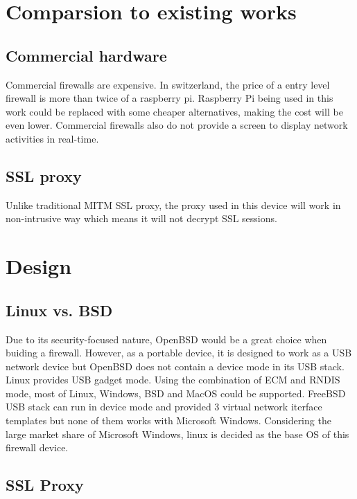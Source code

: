 \documentclass[mscthesis]{usiinfthesis}
\begin{document}
\chapter{Comparsion to existing works}
\section{Commercial hardware}
Commercial firewalls are expensive. In switzerland, the price of a entry 
level firewall is more than twice of a raspberry pi. Raspberry Pi being
used in this work could be replaced with some cheaper alternatives, making 
the cost will be even lower. Commercial firewalls also do not provide a 
screen to display network activities in real-time.

\section{SSL proxy}
Unlike traditional MITM SSL proxy, the proxy used in this device will work 
in non-intrusive way which means it will not decrypt SSL sessions.

\chapter[Design]{Design}

\section{Linux vs. BSD}

Due to its security-focused nature, OpenBSD would be a great choice when buiding a firewall. However, as a portable device, it is designed to work as a USB network device but OpenBSD does not contain a device mode in its USB stack. Linux provides USB gadget mode. Using the combination of ECM and RNDIS mode, most of Linux, Windows, BSD and MacOS could be supported. FreeBSD USB stack can run in device mode and provided 3 virtual network iterface templates but none of them works with Microsoft Windows\citet{freebsdhb:usb}. Considering the large market share of Microsoft Windows, linux is decided as the base OS of this firewall device.

\section{SSL Proxy}
\end{document}

